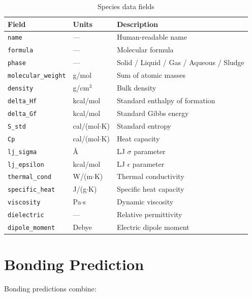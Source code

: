 \documentclass[11pt,a4paper]{article}
\begin{document}
\begin{table}[h]
\centering
\caption{Species data fields}
\label{tab:species}
\begin{tabular}{@{}lll@{}}
\toprule
Field & Units & Description \\
\midrule
\texttt{name}           & ---          & Human-readable name \\
\texttt{formula}        & ---          & Molecular formula \\
\texttt{phase}          & ---          & Solid / Liquid / Gas / Aqueous / Sludge \\
\texttt{molecular\_weight} & g/mol    & Sum of atomic masses \\
\texttt{density}        & g/cm$^3$    & Bulk density \\
\texttt{delta\_Hf}      & kcal/mol    & Standard enthalpy of formation \\
\texttt{delta\_Gf}      & kcal/mol    & Standard Gibbs energy \\
\texttt{S\_std}         & cal/(mol$\cdot$K) & Standard entropy \\
\texttt{Cp}             & cal/(mol$\cdot$K) & Heat capacity \\
\texttt{lj\_sigma}      & \AA         & LJ $\sigma$ parameter \\
\texttt{lj\_epsilon}    & kcal/mol    & LJ $\epsilon$ parameter \\
\texttt{thermal\_cond}  & W/(m$\cdot$K) & Thermal conductivity \\
\texttt{specific\_heat} & J/(g$\cdot$K) & Specific heat capacity \\
\texttt{viscosity}      & Pa$\cdot$s  & Dynamic viscosity \\
\texttt{dielectric}     & ---         & Relative permittivity \\
\texttt{dipole\_moment} & Debye       & Electric dipole moment \\
\bottomrule
\end{tabular}
\end{table}

\section{Bonding Prediction}
\label{sec:bonding}

Bonding predictions combine:
\end{document}
